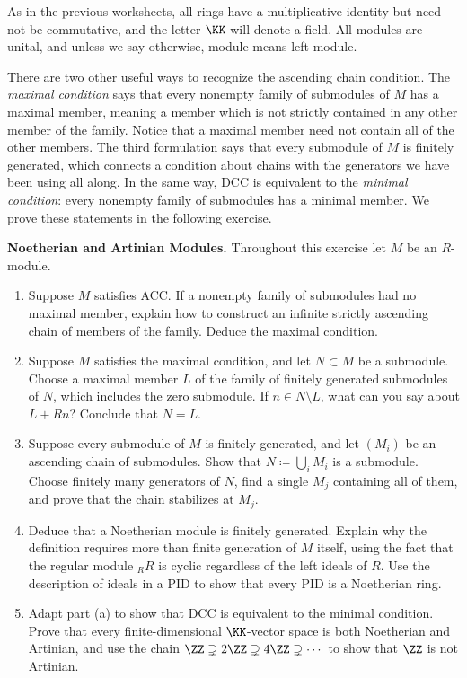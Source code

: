 \documentclass[12pt,reqno]{amsart}
\begin{document}
As in the previous worksheets, all rings have a multiplicative identity but need not be commutative, and the letter $\KK$ will denote a field. All modules are unital, and unless we say otherwise, module means left module.

There are two other useful ways to recognize the ascending chain condition. The \emph{maximal condition} says that every nonempty family of submodules of $M$ has a maximal member, meaning a member which is not strictly contained in any other member of the family. Notice that a maximal member need not contain all of the other members. The third formulation says that every submodule of $M$ is finitely generated, which connects a condition about chains with the generators we have been using all along. In the same way, DCC is equivalent to the \emph{minimal condition}: every nonempty family of submodules has a minimal member. We prove these statements in the following exercise.

\hrulefill

\begin{problems}
\item\label{c:noetherian} \textbf{Noetherian and Artinian Modules.} Throughout this exercise let $M$ be an $R$-module.
\begin{enumerate}
\item Suppose $M$ satisfies ACC. If a nonempty family of submodules had no maximal member, explain how to construct an infinite strictly ascending chain of members of the family. Deduce the maximal condition.
\item Suppose $M$ satisfies the maximal condition, and let $N\subset M$ be a submodule. Choose a maximal member $L$ of the family of finitely generated submodules of $N$, which includes the zero submodule. If $n\in N\setminus L$, what can you say about $L+Rn$? Conclude that $N=L$.
\item Suppose every submodule of $M$ is finitely generated, and let $(M_i)$ be an ascending chain of submodules. Show that $N\coloneqq\bigcup_iM_i$ is a submodule. Choose finitely many generators of $N$, find a single $M_j$ containing all of them, and prove that the chain stabilizes at $M_j$.
\item Deduce that a Noetherian module is finitely generated. Explain why the definition requires more than finite generation of $M$ itself, using the fact that the regular module ${}_RR$ is cyclic regardless of the left ideals of $R$. Use the description of ideals in a PID to show that every PID is a Noetherian ring.
\item Adapt part (a) to show that DCC is equivalent to the minimal condition. Prove that every finite-dimensional $\KK$-vector space is both Noetherian and Artinian, and use the chain $\ZZ\supsetneq2\ZZ\supsetneq4\ZZ\supsetneq\cdots$ to show that $\ZZ$ is not Artinian.
\end{enumerate}
\end{problems}
\end{document}
